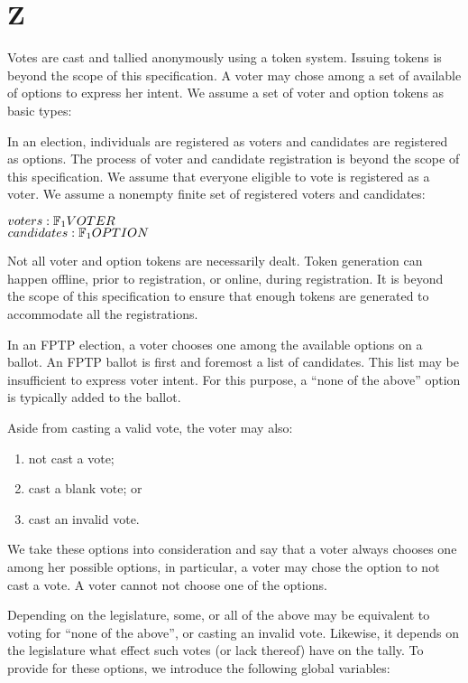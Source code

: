 \chapter{Z}

Votes are cast and tallied anonymously using a token system. Issuing tokens is
beyond the scope of this specification. A voter may chose among a set of
available of options to express her intent. We assume a set of voter and option
tokens as basic types:

\begin{zed}
\end{zed}

In an election, individuals are registered as voters and candidates are
registered as options. The process of voter and candidate registration is
beyond the scope of this specification. We assume that everyone eligible to
vote is registered as a voter. We assume a nonempty finite set of registered
voters and candidates:

\begin{axdef}
$voters : \finset_1 VOTER$ \\
$candidates: \finset_1 OPTION$
\end{axdef}

Not all voter and option tokens are necessarily dealt. Token generation can
happen offline, prior to registration, or online, during registration. It is
beyond the scope of this specification to ensure that enough tokens are
generated to accommodate all the registrations.

In an FPTP election, a voter chooses one among the available options on a
ballot. An FPTP ballot is first and foremost a list of candidates. This list
may be insufficient to express voter intent. For this purpose, a ``none of the
above'' option is typically added to the ballot.

Aside from casting a valid vote, the voter may also:

\begin{enumerate}

\item not cast a vote;

\item cast a blank vote; or

\item cast an invalid vote.

\end{enumerate}

We take these options into consideration and say that a voter always chooses
one among her possible options, in particular, a voter may chose the option to
not cast a vote. A voter cannot not choose one of the options.

Depending on the legislature, some, or all of the above may be equivalent to
voting for ``none of the above'', or casting an invalid vote. Likewise, it
depends on the legislature what effect such votes (or lack thereof) have on the
tally. To provide for these options, we introduce the following global
variables:

